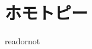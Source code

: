 \documentclass{jsarticle}
\begin{document}
\fi

\section{ホモトピー}

\expandafter\ifx\csname readornot\endcsname\relax
  
\end{document}
